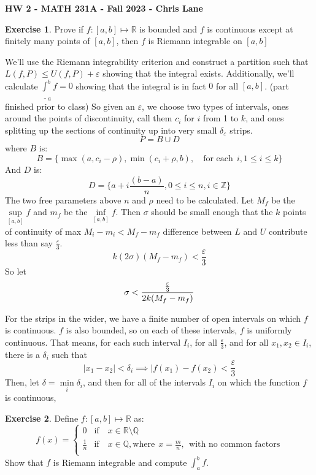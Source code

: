\documentclass[11pt,oneside]{article}
\numberwithin{equation}{section}
\theoremstyle{definition}
\newtheorem{exercise}{Exercise}
\def\RR{\mathbb{R}}
\def\QQ{\mathbb{Q}}
\def\ZZ{\mathbb{Z}}
\begin{document}
\textbf{HW 2 - MATH 231A - Fall 2023 - Chris Lane}
\begin{exercise}
  Prove if $f:[a, b] \mapsto \RR $ is bounded and $f$ is continuous
  except at finitely many points of $[a,b]$, then $f$ is Riemann integrable on $[a,b ]$
\end{exercise}
\begin{solution}
  We'll use the Riemann integrability criterion and construct a
  partition such that $L(f, P) \leq U(f, P) + \varepsilon$ showing that
  the integral exists.  Additionally, we'll calculate $\underline \int
  _{a} ^ {b} f = 0$ showing that the integral is in fact $0$ for all
  $[a,b]$.  (part finished prior to class) So given an $\varepsilon$, we
  choose two types of intervals, ones around the points of
  discontinuity, call them $c_i$ for $i$ from 1 to $k$, and ones
  splitting up the sections of continuity up into very
  small $\delta_{\varepsilon}$ strips.
  $$
  P = B \cup D
  $$
  where $B$ is:
  $$
  B = \{ \max(a, c_i - \rho), \min(c_i + \rho, b), \quad \text{for each} \ \  i, 1 \leq i \leq k \}
  $$
  And $D$ is:
  $$
  D = \{ a + i \frac{(b - a)}{n}, 0 \leq i \leq n, i \in \ZZ \}
  $$
  The two free parameters above $n$ and $\rho$ need to be calculated.  Let $M_f$ be the
  $ \sup \limits_{[a,b]} f$ and $m_f$ be the $ \inf \limits_{[a,b]} f$.  Then $\sigma$ should be
    small enough that the $k$ points of continuity of max $M_i - m_i < M_f - m_f$ difference between
    $L$ and $U$ contribute less than say $\frac{\varepsilon}{3}$.
    $$ k (2 \sigma) (M_f - m_f) < \frac{\varepsilon}{3} $$
    So let 
    $$
    \sigma < {\frac{\varepsilon}{3} \over 2k (M_f - m_f)}
    $$
    
    For the strips in the wider, we have a finite number of open intervals on which $f$ is continuous.  $f$ is also
    bounded, so on each of these intervals, $f$ is uniformly continuous.  That means, for each such interval $I_i$, for
    all $\frac{\varepsilon}{3}$, and for all $x_1, x_2 \in I_i$, there is a $\delta_i$ such that
    $$
    | x_1 - x_2 | < \delta_i \implies | f(x_1) - f(x_2) < \frac{\varepsilon}{3}
    $$
    Then, let $\delta = \min \limits_i \delta_i$, and then for all of the intervals $I_i$ on which the function $f$
    is continuous, 
    
    
  
\end{solution}

\begin{exercise}
  Define $f : [a,b ] \mapsto \RR $ as:
  $$
  f(x) = \begin{cases}
    0 & \text{if} \quad x \in \RR \setminus \QQ \\
    \frac{1}{n} & \text{if} \quad x \in \QQ, \text{where}\ \  x = \frac{m}{n}, \ \ 
    \text{with no common factors} \\
  \end{cases}
  $$
  Show that $f$ is Riemann integrable and compute $\int _ {a} ^ {b} f$.  
\end{exercise}
\end{document}
